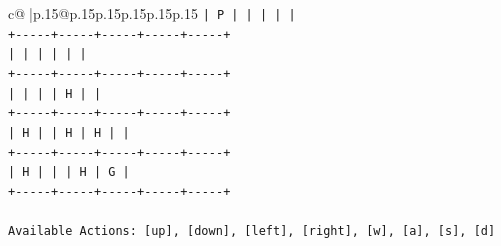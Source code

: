 \documentclass{article}
\begin{document}
{\begin{supertabular}{c@{$\;$}|p{.15\linewidth}@{}p{.15\linewidth}p{.15\linewidth}p{.15\linewidth}p{.15\linewidth}p{.15\linewidth}}
{{{\texttt{|  P  |     |     |     |     |} \\
\texttt{+{-}{-}{-}{-}{-}+{-}{-}{-}{-}{-}+{-}{-}{-}{-}{-}+{-}{-}{-}{-}{-}+{-}{-}{-}{-}{-}+} \\
\texttt{|     |     |     |     |     |} \\
\texttt{+{-}{-}{-}{-}{-}+{-}{-}{-}{-}{-}+{-}{-}{-}{-}{-}+{-}{-}{-}{-}{-}+{-}{-}{-}{-}{-}+} \\
\texttt{|     |     |     |  H  |     |} \\
\texttt{+{-}{-}{-}{-}{-}+{-}{-}{-}{-}{-}+{-}{-}{-}{-}{-}+{-}{-}{-}{-}{-}+{-}{-}{-}{-}{-}+} \\
\texttt{|  H  |     |  H  |  H  |     |} \\
\texttt{+{-}{-}{-}{-}{-}+{-}{-}{-}{-}{-}+{-}{-}{-}{-}{-}+{-}{-}{-}{-}{-}+{-}{-}{-}{-}{-}+} \\
\texttt{|  H  |     |     |  H  |  G  |} \\
\texttt{+{-}{-}{-}{-}{-}+{-}{-}{-}{-}{-}+{-}{-}{-}{-}{-}+{-}{-}{-}{-}{-}+{-}{-}{-}{-}{-}+} \\
\\ 
\texttt{Available Actions: {[}up{]}, {[}down{]}, {[}left{]}, {[}right{]}, {[}w{]}, {[}a{]}, {[}s{]}, {[}d{]}} \\
            }
        }
    }
     \\ \\


\end{supertabular}}
\end{document}

